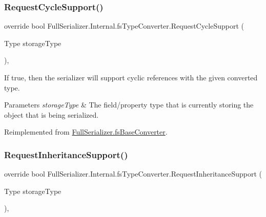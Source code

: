 \subsubsection{\texorpdfstring{Request\+Cycle\+Support()}{RequestCycleSupport()}}
{\footnotesize\ttfamily override bool Full\+Serializer.\+Internal.\+fs\+Type\+Converter.\+Request\+Cycle\+Support (\begin{DoxyParamCaption}\item[{Type}]{storage\+Type }\end{DoxyParamCaption})\hspace{0.3cm}{\ttfamily [inline]}, {\ttfamily [virtual]}}



If true, then the serializer will support cyclic references with the given converted type. 


\begin{DoxyParams}{Parameters}
{\em storage\+Type} & The field/property type that is currently storing the object that is being serialized.\\
\hline
\end{DoxyParams}


Reimplemented from \hyperlink{class_full_serializer_1_1fs_base_converter_a4e850ab88cea1b89771c00e0b65febcd}{Full\+Serializer.\+fs\+Base\+Converter}.

\mbox{\label{class_full_serializer_1_1_internal_1_1fs_type_converter_a3f4750a4e8a6a6ae582c73cf5d8142e5}} 
\subsubsection{\texorpdfstring{Request\+Inheritance\+Support()}{RequestInheritanceSupport()}}
{\footnotesize\ttfamily override bool Full\+Serializer.\+Internal.\+fs\+Type\+Converter.\+Request\+Inheritance\+Support (\begin{DoxyParamCaption}\item[{Type}]{storage\+Type }\end{DoxyParamCaption})\hspace{0.3cm}{\ttfamily [inline]}, {\ttfamily [virtual]}}



